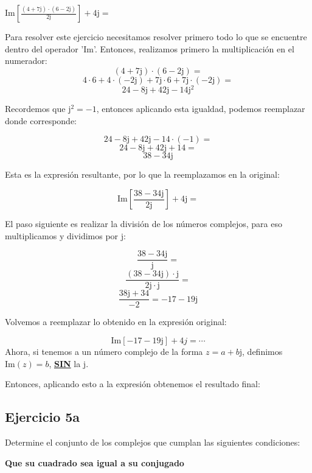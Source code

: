 \documentclass[11pt]{article}
\def\imj{\mathrm{j}}
\begin{document}
		\begin{center}
			$\displaystyle{\mathrm{Im}\left[\frac{\left(4+7\imj\right)\cdot\left(6-2\imj\right)}{2\imj}\right]+4\imj=}$
		\end{center}
		
		Para resolver este ejercicio necesitamos resolver primero todo lo que se encuentre dentro del operador '$\mathrm{Im}$'.
		Entonces, realizamos primero la multiplicación en el numerador:
		$$\left(4+7\imj\right)\cdot\left(6-2\imj\right)=$$
		$$4\cdot6+4\cdot\left(-2\imj\right)+7\imj\cdot6+7\imj\cdot\left(-2\imj\right)=$$
		$$24-8\imj+42\imj-14\imj^{2}$$
		\begin{center}
			Recordemos que $\imj^{2}=-1$, entonces aplicando esta igualdad, podemos reemplazar donde corresponde:
		\end{center}
		$$24-8\imj+42\imj-14\cdot\left(-1\right)=$$
		$$24-8\imj+42\imj+14=$$
		$$\boxed{38-34\imj}$$
		\begin{center}
			Esta es la expresión resultante, por lo que la reemplazamos en la original:
		\end{center}
		$$\displaystyle{\mathrm{Im}\left[\frac{38-34\imj}{2\imj}\right]+4\imj=}$$
		\begin{center}
			El paso siguiente es realizar la división de los números complejos, para eso multiplicamos y dividimos por $\imj$:
		\end{center}
		$$\frac{38-34\imj}{\imj}=$$
		$$\frac{\left(38-34\imj\right)\cdot\imj}{2\imj\cdot\imj}=$$
		$$\frac{38\imj+34}{-2}=\boxed{-17-19\imj}$$
		\begin{center}
			Volvemos a reemplazar lo obtenido en la expresión original:
		\end{center}
		$$\mathrm{Im}\left[-17-19\imj\right]+4j=\cdots$$
		Ahora, si tenemos a un número complejo de la forma $z=a+b\imj$, definimos $\mathrm{Im}(z)=b$, \textbf{\underline{SIN}} la $\imj$.
		
		Entonces, aplicando esto a la expresión obtenemos el resultado final:
		\begin{center}
			\fcolorbox{black}{yellow}{$-19+4\imj$}
		\end{center}
	\subsection{Ejercicio 5a}
		Determine el conjunto de los complejos que cumplan las siguientes condiciones:
		
		\begin{center}
			{\large \textbf{Que su cuadrado sea igual a su conjugado}}
		\end{center}
				
\end{document}
